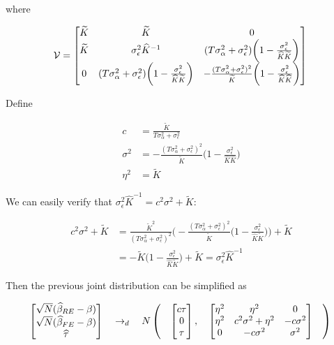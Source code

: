 \documentclass[12pt]{article}
\begin{document}
where 

\[
\mathcal{V} =  \begin{bmatrix}
\widetilde{K} & \widetilde{K} & 0 \\
\widetilde{K} & \sigma_\epsilon^2 \widehat{K}^{-1} & (T\sigma_\alpha^2 + \sigma_\epsilon^2) \bigg(1-\frac{\sigma_\epsilon^2}{\widehat{K}\widetilde{K}}\bigg)\\ 
0 & (T\sigma_\alpha^2 + \sigma_\epsilon^2) \bigg(1-\frac{\sigma_\epsilon^2}{\widehat{K}\widetilde{K}}\bigg) & -\frac{(T\sigma_\alpha^2 +\sigma_\epsilon^2)^2}{\widetilde{K}} \bigg(1-\frac{\sigma_\epsilon^2}{\widehat{K}\widehat{K}}\bigg)
\end{bmatrix} \\
\]

Define

\begin{align*}
c& = \frac{\widetilde{K}}{T\sigma_\alpha^2 + \sigma_\epsilon^2}\\
\sigma^2 & = -\frac{(T\sigma_\alpha^2 +\sigma_\epsilon^2)^2}{\widetilde{K}} \bigg(1-\frac{\sigma_\epsilon^2}{\widehat{K}\widehat{K}}\bigg)\\
\eta^2 & = \widetilde{K}
\end{align*}

We can easily verify that $\sigma_\epsilon^2 \widehat{K}^{-1} = c^2 \sigma^2 + \widetilde{K}$:

\begin{align*}
c^2 \sigma^2 + \widetilde{K} & = \frac{\widetilde{K}^2}{(T\sigma_\alpha^2 + \sigma_\epsilon^2)^2} \bigg( -\frac{(T\sigma_\alpha^2 + \sigma_\epsilon^2)^2}{\widetilde{K}} \bigg(1-\frac{\sigma_\epsilon^2}{\widehat{K}\widetilde{K}}\bigg)\bigg) + \widetilde{K}\\
& = -\widetilde{K} \bigg(1- \frac{\sigma_\epsilon^2}{\widehat{K} \widetilde{
K}}\bigg) + \widetilde{K} = \sigma_\epsilon^2 \widehat{K}^{-1}
\end{align*}



 Then the previous joint distribution can be simplified as


\[
 \begin{bmatrix}
\sqrt{N} (\widehat{\beta}_{RE} - \beta)\\
\sqrt{N} (\widehat{\beta}_{FE} - \beta)\\
\widehat{\tau}
\end{bmatrix} \quad \rightarrow_d \quad  N \left( \quad  \begin{bmatrix}
c\tau \\
0  \\
\tau\\
\end{bmatrix},  \quad \begin{bmatrix}
\eta^2 & \eta^2 & 0 \\
\eta^2 & c^2\sigma^2 + \eta^2 & -c\sigma^2\\ 
0 & -c\sigma^2 & \sigma^2
\end{bmatrix}  \quad  \right)\\
\]
\end{document}
